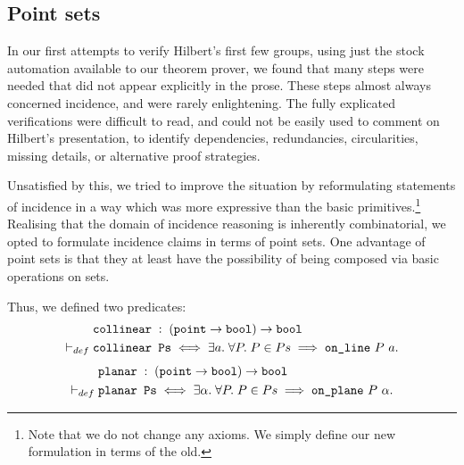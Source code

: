 
\subsection{Point sets}
In our first attempts to verify Hilbert's first few groups, using just the stock automation available to our theorem prover, we found that many steps were needed that did not appear explicitly in the prose. These steps almost always concerned incidence, and were rarely enlightening. The fully explicated verifications were difficult to read, and could not be easily used to comment on Hilbert's presentation, to identify dependencies, redundancies, circularities, missing details, or alternative proof strategies.

Unsatisfied by this, we tried to improve the situation by reformulating statements of incidence in a way which was more expressive than the basic primitives.\footnote{Note that we do not change any axioms. We simply define our new formulation in terms of the old.} Realising that the domain of incidence reasoning is inherently combinatorial, we opted to formulate incidence claims in terms of point sets. One advantage of point sets is that they at least have the possibility of being composed via basic operations on sets.

Thus, we defined two predicates:
\begin{align*}
&\texttt{collinear}\;:\;(\texttt{point}\rightarrow\texttt{bool})\rightarrow\texttt{bool}
\\\vdash_{def}\;&\texttt{collinear\ Ps} \iff \exists a.\; \forall P.\; P \in Ps \implies \texttt{on\_line}\ P\ a.
\end{align*}
\begin{align*}
&\texttt{planar}\;:\;(\texttt{point}\rightarrow\texttt{bool})\rightarrow\texttt{bool}
\\\vdash_{def}\;&\texttt{planar\ Ps} \iff \exists \alpha.\; \forall P.\; P \in Ps \implies \texttt{on\_plane}\ P\ \alpha.
\end{align*}

